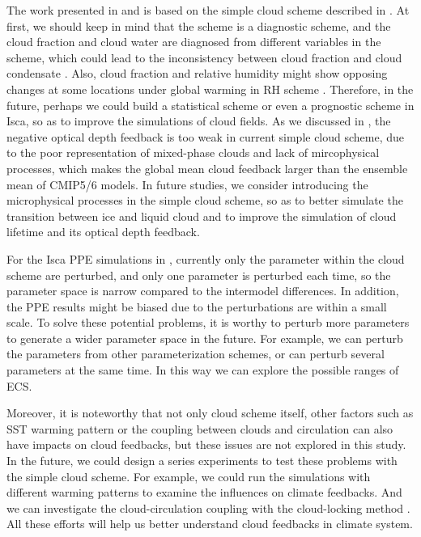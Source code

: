 
The work presented in  and  is based on the simple cloud scheme described in \cite{Liu2021simcloud}. At first, we should keep in mind that the scheme is a diagnostic scheme, and the cloud fraction and cloud water are diagnosed from different variables in the scheme, which could lead to the inconsistency between cloud fraction and cloud condensate \citep[e.g.,][]{Gregory2002,Tompkins2005}. Also, cloud fraction and relative humidity might show opposing changes at some locations under global warming in RH scheme \citep{Ming2018}. Therefore, in the future, perhaps we could build a statistical scheme or even a prognostic scheme in Isca, so as to improve the simulations of cloud fields. As we discussed in , the negative optical depth feedback is too weak in current simple cloud scheme, due to the poor representation of mixed-phase clouds and lack of mircophysical processes, which makes the global mean cloud feedback larger than the ensemble mean of CMIP5/6 models. In future studies, we consider introducing the microphysical processes in the simple cloud scheme, so as to better simulate the transition between ice and liquid cloud and to improve the simulation of cloud lifetime and its optical depth feedback. 

For the Isca PPE simulations in , currently only the parameter within the cloud scheme are perturbed, and only one parameter is perturbed each time, so the parameter space is narrow compared to the intermodel differences. In addition, the PPE results might be biased due to the perturbations are within a small scale. To solve these potential problems, it is worthy to perturb more parameters to generate a wider parameter space in the future. For example, we can perturb the parameters from other parameterization schemes, or can perturb several parameters at the same time. In this way we can explore the possible ranges of ECS.

Moreover, it is noteworthy that not only cloud scheme itself, other factors such as SST warming pattern \citep[e.g.,][]{Zhou2016,Dong2019attributing,Dong2020intermodel} or the coupling between clouds and circulation \citep[e.g.,][]{Bony2004,Vial2013} can also have impacts on cloud feedbacks, but these issues are not explored in this study. In the future, we could design a series experiments to test these problems with the simple cloud scheme. For example, we could run the simulations with different warming patterns to examine the influences on climate feedbacks. And we can investigate the cloud-circulation coupling with the cloud-locking method \citep[e.g.,][]{Voigt2020review}. All these efforts will help us better understand cloud feedbacks in climate system.


